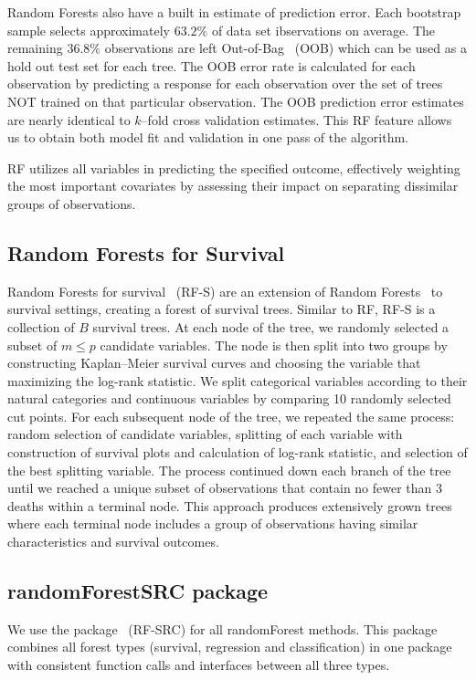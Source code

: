 \documentclass[nojss]{jss}\usepackage[]{graphicx}\usepackage[]{color}
\begin{document}
Random Forests also have a built in estimate of prediction error. Each bootstrap sample selects approximately $63.2\%$ of data set ibservations on average. The remaining $36.8\%$ observations are left Out-of-Bag~\citep{BreimanOOB:1996e} (OOB) which can be used as a hold out test set for each tree. The OOB error rate is calculated for each observation by predicting a response for each observation over the set of trees NOT trained on that particular observation. The OOB prediction error estimates are nearly identical to $k$--fold cross validation estimates. This RF feature allows us to obtain both model fit and validation in one pass of the algorithm.

RF utilizes all variables in predicting the specified outcome, effectively weighting the most important covariates by assessing their impact on separating dissimilar groups of observations. 

\subsection{Random Forests for Survival}\label{S:rfs}
Random Forests for survival~\citep{Ishwaran:2007,Ishwaran:2008} (RF-S) are an extension of Random Forests~\citep{Breiman:2001} to survival settings, creating a forest of survival trees. Similar to RF, RF-S is a collection of $B$ survival trees. At each node of the tree, we randomly selected a subset of $m \le p$ candidate variables. The node is then split into two groups by constructing Kaplan--Meier survival curves and choosing the variable that maximizing the log-rank statistic. We split categorical variables according to their natural categories and continuous variables by comparing 10 randomly selected cut points. For each subsequent node of the tree, we repeated the same process: random selection of candidate variables, splitting of each variable with construction of survival plots and calculation of log-rank statistic, and selection of the best splitting variable. The process continued down each branch of the tree until we reached a unique subset of observations that contain no fewer than 3 deaths within a terminal node. This approach produces extensively grown trees where each terminal node includes a group of observations having similar characteristics and survival outcomes.

\subsection{randomForestSRC package}
We use the  package~\citep{IshwaranRFSRC:2014} (RF-SRC) for all randomForest methods. This package combines all forest types (survival, regression and classification) in one package with consistent function calls and interfaces between all three types. 
\end{document}

